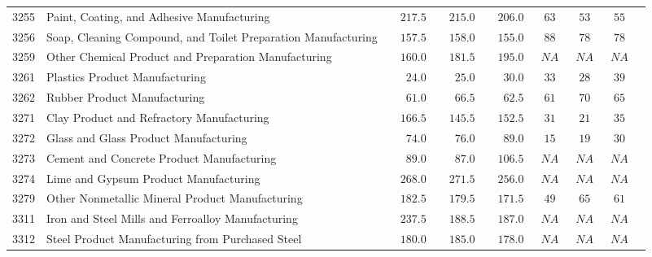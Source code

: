 \documentclass[9pt, oneside]{article}   	%
\begin{document}
\begin{longtable}{lp{3.5 in}ccccccc}
3255  & Paint, Coating, and Adhesive Manufacturing & $\phantom{00}217.5$ & $\phantom{00}215.0$ & $\phantom{00}206.0$ & $\phantom{0}63$ & $\phantom{0}53$ & $\phantom{0}55$ \\
3256  & Soap, Cleaning Compound, and Toilet Preparation Manufacturing & $\phantom{00}157.5$ & $\phantom{00}158.0$ & $\phantom{00}155.0$ & $\phantom{0}88$ & $\phantom{0}78$ & $\phantom{0}78$ \\
3259  & Other Chemical Product and Preparation Manufacturing & $\phantom{00}160.0$ & $\phantom{00}181.5$ & $\phantom{00}195.0$ & $\phantom{0}NA$ & $\phantom{0}NA$ & $\phantom{0}NA$ \\
3261  & Plastics Product Manufacturing & $\phantom{000}24.0$ & $\phantom{000}25.0$ & $\phantom{000}30.0$ & $\phantom{0}33$ & $\phantom{0}28$ & $\phantom{0}39$ \\
3262  & Rubber Product Manufacturing & $\phantom{000}61.0$ & $\phantom{000}66.5$ & $\phantom{000}62.5$ & $\phantom{0}61$ & $\phantom{0}70$ & $\phantom{0}65$ \\
3271  & Clay Product and Refractory Manufacturing & $\phantom{00}166.5$ & $\phantom{00}145.5$ & $\phantom{00}152.5$ & $\phantom{0}31$ & $\phantom{0}21$ & $\phantom{0}35$ \\
3272  & Glass and Glass Product Manufacturing & $\phantom{000}74.0$ & $\phantom{000}76.0$ & $\phantom{000}89.0$ & $\phantom{0}15$ & $\phantom{0}19$ & $\phantom{0}30$ \\
3273  & Cement and Concrete Product Manufacturing & $\phantom{000}89.0$ & $\phantom{000}87.0$ & $\phantom{00}106.5$ & $\phantom{0}NA$ & $\phantom{0}NA$ & $\phantom{0}NA$ \\
3274  & Lime and Gypsum Product Manufacturing & $\phantom{00}268.0$ & $\phantom{00}271.5$ & $\phantom{00}256.0$ & $\phantom{0}NA$ & $\phantom{0}NA$ & $\phantom{0}NA$ \\
3279  & Other Nonmetallic Mineral Product Manufacturing & $\phantom{00}182.5$ & $\phantom{00}179.5$ & $\phantom{00}171.5$ & $\phantom{0}49$ & $\phantom{0}65$ & $\phantom{0}61$ \\
3311  & Iron and Steel Mills and Ferroalloy Manufacturing & $\phantom{00}237.5$ & $\phantom{00}188.5$ & $\phantom{00}187.0$ & $\phantom{0}NA$ & $\phantom{0}NA$ & $\phantom{0}NA$ \\
3312  & Steel Product Manufacturing from Purchased Steel & $\phantom{00}180.0$ & $\phantom{00}185.0$ & $\phantom{00}178.0$ & $\phantom{0}NA$ & $\phantom{0}NA$ & $\phantom{0}NA$ \\

\end{longtable}
\end{document}
